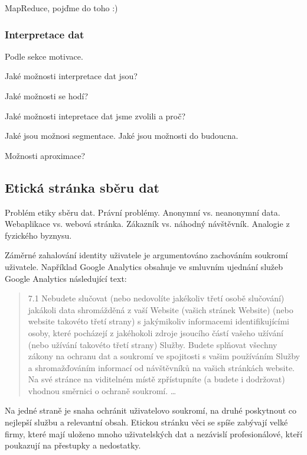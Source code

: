 \documentclass[bc,female,java,dept456]{diploma}						%
\begin{document}
MapReduce, pojďme do toho :)



\subsubsection{Interpretace dat}

Podle sekce motivace.

Jaké možnosti interpretace dat jsou?

Jaké možnosti se hodí?

Jaké možnosti intepretace dat jsme zvolili a proč?

Jaké jsou možnosi segmentace. 
Jaké jsou možnosti do budoucna.

Možnosti aproximace?



\subsection{Etická stránka sběru dat}

Problém etiky sběru dat.
Právní problémy.
Anonymní vs. neanonymní data.
Webaplikace vs. webová stránka.
Zákazník vs. náhodný návštěvník.
Analogie z fyzického byznysu.


Záměrné zahalování identity uživatele je argumentováno zachováním soukromí uživatele. Například Google Analytics obsahuje ve smluvním ujednání služeb Google Analytics následující text:

\begin{quote}
7.1 Nebudete slučovat (nebo nedovolíte jakékoliv třetí osobě slučování) jakákoli data shromážděná z vaší Website (vašich stránek Website) (nebo website takovéto třetí strany) s jakýmikoliv informacemi identifikujícími osoby, které pocházejí z jakéhokoli zdroje jsoucího částí vašeho užívání (nebo užívání takovéto třetí strany) Služby. Budete splňovat všechny zákony na ochranu dat a soukromí ve spojitosti s vašim používáním Služby a shromažďováním informací od návštěvníků na vašich stránkách website. Na své stránce na viditelném místě zpřístupníte (a budete i dodržovat) vhodnou směrnici o ochraně soukromí.
\ldots
\end{quote}

Na jedné straně je snaha ochránit uživatelovo soukromí, na druhé poskytnout co nejlepší službu a relevantní obsah. Etickou stránku věci se spíše zabývají velké firmy, které mají uloženo mnoho uživatelských dat a nezávislí profesionálové, kteří poukazují na přestupky a nedostatky.
\end{document}
